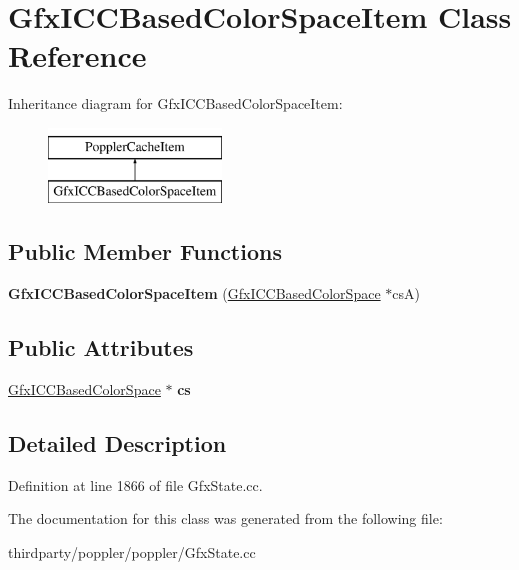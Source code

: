 \hypertarget{class_gfx_i_c_c_based_color_space_item}{}\section{Gfx\+I\+C\+C\+Based\+Color\+Space\+Item Class Reference}
\label{class_gfx_i_c_c_based_color_space_item}
Inheritance diagram for Gfx\+I\+C\+C\+Based\+Color\+Space\+Item\+:\begin{figure}[H]
\begin{center}
\leavevmode
\includegraphics[height=2.000000cm]{class_gfx_i_c_c_based_color_space_item}
\end{center}
\end{figure}
\subsection*{Public Member Functions}
\begin{DoxyCompactItemize}
\item 
\mbox{\label{class_gfx_i_c_c_based_color_space_item_ae4ab75e79c64c666f6d424db56f770b3}} 
{\bfseries Gfx\+I\+C\+C\+Based\+Color\+Space\+Item} (\hyperlink{class_gfx_i_c_c_based_color_space}{Gfx\+I\+C\+C\+Based\+Color\+Space} $\ast$csA)
\end{DoxyCompactItemize}
\subsection*{Public Attributes}
\begin{DoxyCompactItemize}
\item 
\mbox{\label{class_gfx_i_c_c_based_color_space_item_ae9481a1a7a9cf82be171f6c759309944}} 
\hyperlink{class_gfx_i_c_c_based_color_space}{Gfx\+I\+C\+C\+Based\+Color\+Space} $\ast$ {\bfseries cs}
\end{DoxyCompactItemize}


\subsection{Detailed Description}


Definition at line 1866 of file Gfx\+State.\+cc.



The documentation for this class was generated from the following file\+:\begin{DoxyCompactItemize}
\item 
thirdparty/poppler/poppler/Gfx\+State.\+cc\end{DoxyCompactItemize}
